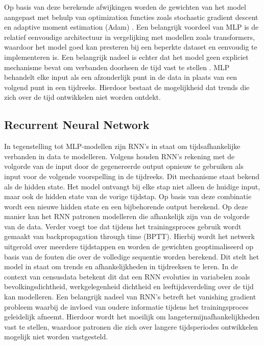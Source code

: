 Op basis van deze berekende afwijkingen worden de gewichten van het model aangepast met behulp van optimization functies zoals stochastic gradient descent \autocite{Tian2023} en adaptive moment estimation (Adam) \autocite{Yang2024}.
Een belangrijk voordeel van MLP is de relatief eenvoudige architectuur in vergelijking met modellen zoals transformers, waardoor het model goed kan presteren bij een beperkte dataset en eenvoudig te implementeren is. Een belangrijk nadeel is echter dat het model geen expliciet mechanisme bevat om verbanden doorheen de tijd vast te stellen \autocite{Kim2025}. MLP behandelt elke input als een afzonderlijk punt in de data in plaats van een volgend punt in een tijdreeks. Hierdoor bestaat de mogelijkheid dat trends die zich over de tijd ontwikkelen niet worden ontdekt.

\subsection{Recurrent Neural Network}
In tegenstelling tot MLP-modellen zijn RNN's in staat om tijdsafhankelijke verbanden in data te modelleren. Volgens \textcite{Song2024} houden RNN’s rekening met de volgorde van de input door de gegenereerde output opnieuw te gebruiken als input voor de volgende voorspelling in de tijdreeks. Dit mechanisme staat bekend als de hidden state. Het model ontvangt bij elke stap niet alleen de huidige input, maar ook de hidden state van de vorige tijdstap. Op basis van deze combinatie wordt een nieuwe hidden state en een bijbehorende output berekend. Op deze manier kan het RNN patronen modelleren die afhankelijk zijn van de volgorde van de data.
Verder voegt \textcite{Sherstinsky2018} toe dat tijdens het trainingsproces gebruik wordt gemaakt van backpropagation through time (BPTT). Hierbij wordt het netwerk uitgerold over meerdere tijdstappen en worden de gewichten geoptimaliseerd op basis van de fouten die over de volledige sequentie worden berekend. Dit stelt het model in staat om trends en afhankelijkheden in tijdreeksen te leren. In de context van censusdata betekent dit dat een RNN evoluties in variabelen zoals bevolkingsdichtheid, werkgelegenheid dichtheid en leeftijdsverdeling over de tijd kan modelleren.
Een belangrijk nadeel van RNN’s betreft het vanishing gradient probleem waarbij de invloed van oudere informatie tijdens het trainingsproces geleidelijk afneemt. Hierdoor wordt het moeilijk om langetermijnafhankelijkheden vast te stellen, waardoor patronen die zich over langere tijdsperiodes ontwikkelen mogelijk niet worden vastgesteld.

